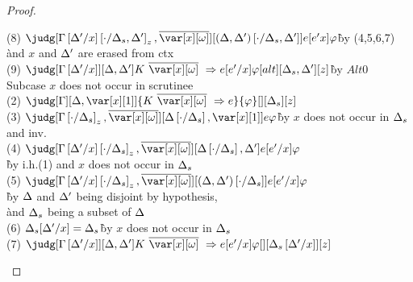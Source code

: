 \begin{proof}
\begin{description}
\begin{tabbing}
    (8) $\judg[\subst{\subst{\G}{\D'}{x}}{\cdot}{\D_s,\D'}_z,\ov{\xo}][\subst{(\D,\D')}{\cdot}{\D_s,\D'}]{e[e'x]}{\vp}$\` by (4,5,6,7)\\\` and $x$ and $\Delta'$ are erased from ctx\\
    (9) $\judg[\subst{\G}{\D'}{x}][\D,\D']{K~\ov{\xo}~\Rightarrow e[e'/x]}{ \vp}[alt][\D_s,\D'][z]$\` by $Alt0$\\
  Subcase $x$ does not occur in scrutinee\\
    (2) $\judg[\G][\D,\xl]{K~\ov{\xo}~\Rightarrow e}{\vp}[][\D_s][z]$\\
    (3) $\judg[\subst{\G}{\cdot}{\D_s}_z,\ov{\xo}][\subst{\D}{\cdot}{\D_s},\xl]{e}{\vp}$\`by $x$ does not occur in $\Delta_s$ and inv.\\
    (4) $\judg[\subst{\subst{\G}{\D'}{x}}{\cdot}{\D_s}_z,\ov{\xo}][\subst{\D}{\cdot}{\D_s},\D']{e[e'/x]}{\vp}$\\\`by i.h.(1) and $x$ does not occur in $\Delta_s$\\
    (5) $\judg[\subst{\subst{\G}{\D'}{x}}{\cdot}{\D_s}_z,\ov{\xo}][\subst{(\D,\D')}{\cdot}{\D_s}]{e[e'/x]}{\vp}$\\
    \`by $\Delta$ and $\Delta'$ being disjoint by hypothesis,\\
    \`and $\Delta_s$ being a subset of $\Delta$\\ %
    (6) $\Delta_s[\Delta'/x] = \Delta_s$\`by $x$ does not occur in $\Delta_s$\\
    (7) $\judg[\subst{\G}{\D'}{x}][\D,\D']{K~\ov{\xo}~\Rightarrow e[e'/x]}{\vp}[][\subst{\D_s}{\D'}{x}][z]$\\
\end{tabbing}


\end{description}

\end{proof}

